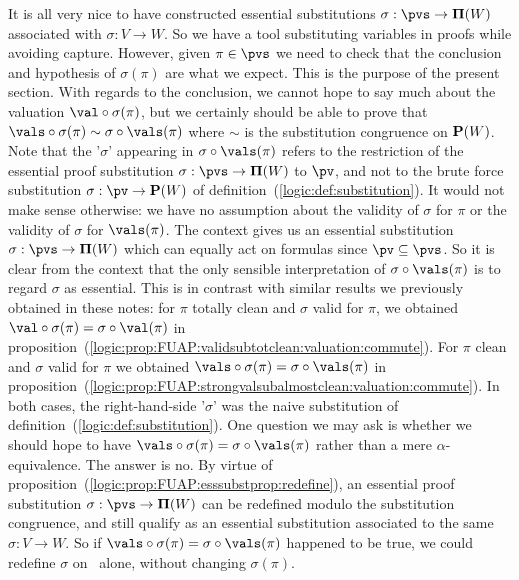 It is all very nice to have constructed essential substitutions
$\sigma:\pvs\to{\bf\Pi}(W)$ associated with $\sigma:V\to W$. So we
have a tool substituting variables in proofs while avoiding capture.
However, given $\pi\in\pvs$ we need to check that the conclusion and
hypothesis of $\sigma(\pi)$ are what we expect. This is the purpose
of the present section. With regards to the conclusion, we cannot
hope to say much about the valuation $\val\circ\sigma(\pi)$, but we
certainly should be able to prove that
$\vals\circ\sigma(\pi)\sim\sigma\circ\vals(\pi)$ where $\sim$ is the
substitution congruence on ${\bf P}(W)$. Note that the '$\sigma$'
appearing in $\sigma\circ\vals(\pi)$ refers to the restriction of
the essential proof substitution $\sigma:\pvs\to{\bf\Pi}(W)$  to
$\pv$, and not to the brute force substitution $\sigma:\pv\to{\bf
P}(W)$ of definition~(\ref{logic:def:substitution}). It would not
make sense otherwise: we have no assumption about the validity of
$\sigma$ for $\pi$ or the validity of $\sigma$ for $\vals(\pi)$. The
context gives us an essential substitution
$\sigma:\pvs\to{\bf\Pi}(W)$ which can equally act on formulas since
$\pv\subseteq\pvs$. So it is clear from the context that the only
sensible interpretation of $\sigma\circ\vals(\pi)$ is to regard
$\sigma$ as essential. This is in contrast with similar results we
previously obtained in these notes: for $\pi$ totally clean and
$\sigma$ valid for $\pi$, we obtained
$\val\circ\sigma(\pi)=\sigma\circ\val(\pi)$ in
proposition~(\ref{logic:prop:FUAP:validsubtotclean:valuation:commute}).
For $\pi$ clean and $\sigma$ valid for $\pi$ we obtained
$\vals\circ\sigma(\pi)=\sigma\circ\vals(\pi)$ in
proposition~(\ref{logic:prop:FUAP:strongvalsubalmostclean:valuation:commute}).
In both cases, the right-hand-side '$\sigma$' was the naive
substitution of definition~(\ref{logic:def:substitution}). One
question we may ask is whether we should hope to have
$\vals\circ\sigma(\pi)=\sigma\circ\vals(\pi)$ rather than a mere
$\alpha$-equivalence. The answer is no. By virtue of
proposition~(\ref{logic:prop:FUAP:esssubstprop:redefine}), an
essential proof substitution $\sigma:\pvs\to{\bf \Pi}(W)$ can be
redefined modulo the substitution congruence, and still qualify as
an essential substitution associated to the same $\sigma:V\to W$. So
if $\vals\circ\sigma(\pi)=\sigma\circ\vals(\pi)$ happened to be
true, we could redefine $\sigma$ on \pv\ alone, without changing
$\sigma(\pi)$.


